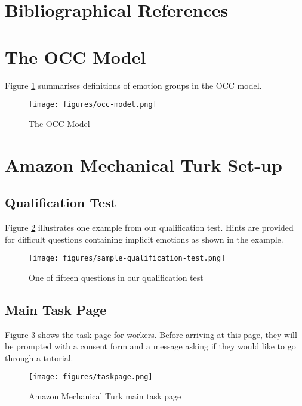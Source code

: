\documentclass[10pt, a4paper]{article}
\begin{document}
\section{Bibliographical References}\label{reference}








\newpage
\appendix
\onecolumn
{}
\section{The OCC Model}
\label{sec:the-occ-model}
Figure \ref{fig:occ-model} summarises definitions of emotion groups in the OCC model.

\begin{figure}[!htbp]
    \centering
    \texttt{[image: figures/occ-model.png]}
    \caption{The OCC Model}
    \label{fig:occ-model}
\end{figure}

\newpage
{}
\section{Amazon Mechanical Turk Set-up}
\label{sec:amt-setup}

\subsection{Qualification Test}
Figure \ref{fig:qualification-test} illustrates one example from our qualification test. Hints are provided for difficult questions containing implicit emotions as shown in the example. 

\begin{figure}[!htbp]
    \centering
    \texttt{[image: figures/sample-qualification-test.png]}
    \caption{One of fifteen questions in our qualification test}
    \label{fig:qualification-test}
\end{figure}

\subsection{Main Task Page}
Figure \ref{fig:taskpage} shows the task page for workers. Before arriving at this page, they will be prompted with a consent form and a message asking if they would like to go through a tutorial.

\begin{figure}[!htbp]
    \centering
    \texttt{[image: figures/taskpage.png]}
    \caption{Amazon Mechanical Turk main task page}
    \label{fig:taskpage}
\end{figure}
\end{document}
